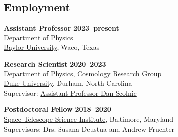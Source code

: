 \documentclass[margin]{res}
\begin{document}
\begin{resume}

\section{Employment} 

{\bf Assistant Professor} \hfill {\bf 2023--present}\\
\href{https://baylor.edu/phsycis}{Department of Physics}\\%
\href{https://baylor.edu}{Baylor University}, Waco, Texas

{\bf Research Scientist} \hfill {\bf 2020--2023}\\
Department of Physics, \href{https://phy.duke.edu/research/research-areas/astrophysics}{Cosmology Research Group}\\
\href{https://phy.duke.edu}{Duke University}, Durham, North Carolina\\ 
Supervisor: \href{https://phy.duke.edu/people/daniel-m-scolnic}{Assistant Professor Dan Scolnic}

{\bf Postdoctoral Fellow} \hfill {\bf 2018--2020}\\
\href{http://www.stsci.edu}{Space Telescope Science Institute}, Baltimore, Maryland\\ 
Supervisors: Drs. Susana Deustua and Andrew Fruchter


 


\end{resume}
\end{document}
